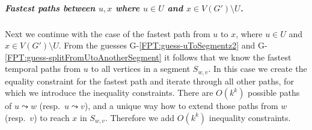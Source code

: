 \documentclass[a4paper,UKenglish,cleveref, autoref, thm-restate, anonymous]{lipics-v2021}
\begin{document}
\subparagraph{\boldmath Fastest paths between $u,x$ where $u \in U$ and $x \in V(G') \setminus U$.}
Next we continue with the case of the fastest path from $u$ to $x$, where $u \in U$ and $x \in V(G') \setminus U$.
From the guesses G-\ref{FPT:guess-uToSegmentz2} and G-\ref{FPT:guess-splitFromUtoAnotherSegment} it follows that we know the fastest temporal paths from $u$ to all vertices in a segment $S_{w,v}$.
In this case we create the equality constraint for the fastest path and
iterate through all other paths, for which we introduce the inequality constraints.
There are $O(k^k)$ possible paths of $u \leadsto w$ (resp.~$u \leadsto v$),
and a unique way how to extend those paths from $w$ (resp.~$v$) to reach $x$ in $S_{w,v}$.
Therefore we add $O(k^k)$ inequality constraints.

\end{document}
